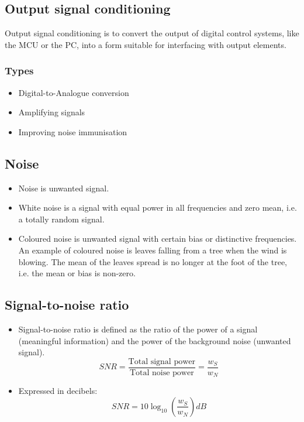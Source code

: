 \documentclass[11pt]{article}
\begin{document}
\subsection{Output signal conditioning}
\label{sec:org7c16664}
Output signal conditioning is to convert the output of digital control systems, like the MCU or the PC, into a form suitable for interfacing with output elements.

\subsubsection{Types}
\label{sec:org2d31b46}
\begin{itemize}
\item Digital-to-Analogue conversion
\item Amplifying signals
\item Improving noise immunisation
\end{itemize}

\subsection{Noise}
\label{sec:orgc02279d}
\begin{itemize}
\item Noise is unwanted signal.
\item White noise is a signal with equal power in all frequencies and zero mean, i.e. a totally random signal.
\item Coloured noise is unwanted signal with certain bias or distinctive frequencies. An example of coloured noise is leaves falling from a tree when the wind is blowing. The mean of the leaves spread is no longer at the foot of the tree, i.e. the mean or bias is non-zero.
\end{itemize}

\subsection{Signal-to-noise ratio}
\label{sec:org14065ad}
\begin{itemize}
\item Signal-to-noise ratio is defined as the ratio of the power of a signal (meaningful information) and the power of the background noise (unwanted signal).
\[SNR = \frac{\text{Total signal power}}{\text{Total noise power}} = \frac{w_S}{w_N}\]
\item Expressed in decibels:
\[SNR = 10 \log_{10} \left(\frac{w_S}{w_N} \right) \unit{dB}\]
\end{itemize}
\end{document}
